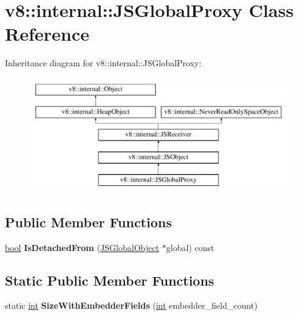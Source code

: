 \hypertarget{classv8_1_1internal_1_1JSGlobalProxy}{}\section{v8\+:\+:internal\+:\+:J\+S\+Global\+Proxy Class Reference}
\label{classv8_1_1internal_1_1JSGlobalProxy}
Inheritance diagram for v8\+:\+:internal\+:\+:J\+S\+Global\+Proxy\+:\begin{figure}[H]
\begin{center}
\leavevmode
\includegraphics[height=5.000000cm]{classv8_1_1internal_1_1JSGlobalProxy}
\end{center}
\end{figure}
\subsection*{Public Member Functions}
\begin{DoxyCompactItemize}
\item 
\mbox{\label{classv8_1_1internal_1_1JSGlobalProxy_a593856720dd8917ddd0887980a5af135}} 
\mbox{\hyperlink{classbool}{bool}} {\bfseries Is\+Detached\+From} (\mbox{\hyperlink{classv8_1_1internal_1_1JSGlobalObject}{J\+S\+Global\+Object}} $\ast$global) const
\end{DoxyCompactItemize}
\subsection*{Static Public Member Functions}
\begin{DoxyCompactItemize}
\item 
\mbox{\label{classv8_1_1internal_1_1JSGlobalProxy_a698507151a691425418542c4ffbbb024}} 
static \mbox{\hyperlink{classint}{int}} {\bfseries Size\+With\+Embedder\+Fields} (\mbox{\hyperlink{classint}{int}} embedder\+\_\+field\+\_\+count)
\end{DoxyCompactItemize}
